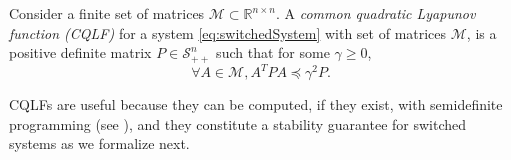 \begin{defn}
Consider a finite set of matrices $\mathcal{M} \subset \mathbb{R}^{n \times n}$. A \emph{common quadratic Lyapunov function (CQLF)} for a system \eqref{eq:switchedSystem} with set of matrices $\mathcal{M}$, is a positive definite matrix $P \in \mathcal{S}_{++}^n$ such that for some $\gamma \geq 0$, 
\begin{equation}\label{eq:lyap}
\forall A \in \mathcal{M}, A^T P A \preceq \gamma^2P.
\end{equation}
\end{defn}
\vspace{-0.5cm}
CQLFs are useful because they can be computed, if they exist, with semidefinite programming (see \cite{boyd}), and they constitute a stability guarantee for switched systems as we formalize next.

